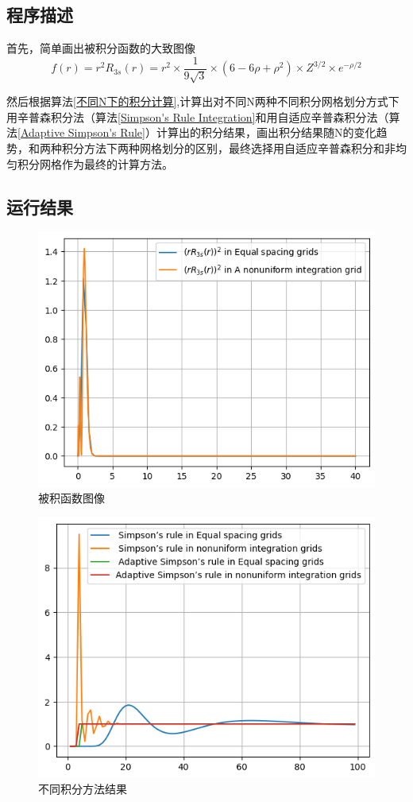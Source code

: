 \documentclass[11pt]{article}
\begin{document}
\subsection{程序描述}
首先，简单画出被积分函数的大致图像
\begin{equation}
    f(r) =r^2R_{3s}(r) = r^2\times \frac{1}{9\sqrt{3}} \times (6 - 6 \rho + \rho^2) \times Z^{3/2} \times e^{-\rho/2}
\end{equation}

然后根据算法\ref{不同N下的积分计算},计算出对不同N两种不同积分网格划分方式下用辛普森积分法（算法\ref{Simpson's Rule Integration}和用自适应辛普森积分法（算法\ref{Adaptive Simpson's Rule}）计算出的积分结果，画出积分结果随N的变化趋势，和两种积分方法下两种网格划分的区别，最终选择用自适应辛普森积分和非均匀积分网格作为最终的计算方法。

\subsection{运行结果}
\begin{figure}[H]
    \centering
    \includegraphics[width=0.5\linewidth]{被积函数图像.png}
    \caption{被积函数图像}
    \label{fig:被积函数图像}
\end{figure}

\begin{figure}[H]
    \centering
    \includegraphics[width=0.5\linewidth]{不同积分方法结果.png}
    \caption{不同积分方法结果}
    \label{fig:不同积分方法结果}
\end{figure}
\end{document}
